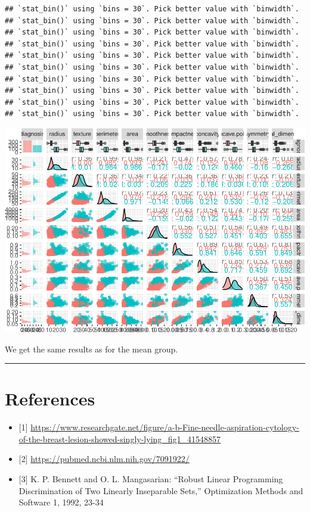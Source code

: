 \documentclass[
  11pt,
]{article}
\providecommand{\tightlist}{%
  \setlength{\itemsep}{0pt}\setlength{\parskip}{0pt}}
\begin{document}
\begin{verbatim}
## `stat_bin()` using `bins = 30`. Pick better value with `binwidth`.
## `stat_bin()` using `bins = 30`. Pick better value with `binwidth`.
## `stat_bin()` using `bins = 30`. Pick better value with `binwidth`.
## `stat_bin()` using `bins = 30`. Pick better value with `binwidth`.
## `stat_bin()` using `bins = 30`. Pick better value with `binwidth`.
## `stat_bin()` using `bins = 30`. Pick better value with `binwidth`.
## `stat_bin()` using `bins = 30`. Pick better value with `binwidth`.
## `stat_bin()` using `bins = 30`. Pick better value with `binwidth`.
## `stat_bin()` using `bins = 30`. Pick better value with `binwidth`.
## `stat_bin()` using `bins = 30`. Pick better value with `binwidth`.
\end{verbatim}

\includegraphics{stat_DAP_files/figure-latex/unnamed-chunk-20-2.pdf}

We get the same results as for the mean group.

\begin{center}\rule{0.5\linewidth}{0.5pt}\end{center}

\hypertarget{references}{%
\section{References}\label{references}}

\begin{itemize}
\tightlist
\item
  {[}1{]}
  \url{https://www.researchgate.net/figure/a-b-Fine-needle-aspiration-cytology-of-the-breast-lesion-showed-singly-lying_fig1_41548857}
\item
  {[}2{]} \url{https://pubmed.ncbi.nlm.nih.gov/7091922/}
\item
  {[}3{]} K. P. Bennett and O. L. Mangasarian: ``Robust Linear
  Programming Discrimination of Two Linearly Inseparable Sets,''
  Optimization Methods and Software 1, 1992, 23-34
\end{itemize}
\end{document}
